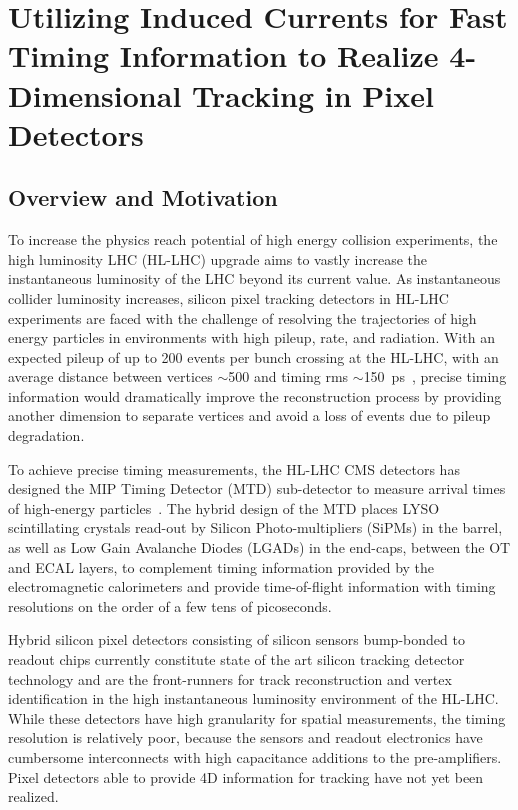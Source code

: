 
\chapter{Utilizing Induced Currents for Fast Timing Information to Realize 4-Dimensional Tracking in Pixel Detectors}

\section{Overview and Motivation}
To increase the physics reach potential of high energy collision experiments, the high luminosity LHC (HL-LHC) upgrade aims to vastly increase the instantaneous luminosity of the LHC beyond its current value. 
As instantaneous collider luminosity increases, silicon pixel tracking detectors in HL-LHC experiments are faced with the challenge of resolving the trajectories of high energy particles in environments with high pileup, rate, and radiation.
With an expected pileup of up to 200 events per bunch crossing at the HL-LHC, with an average distance between vertices $\sim$\SI{500}{\micron} and timing rms $\sim$\SI{150}{\ps}~\cite{CARTIGLIA201747}, precise timing information would dramatically improve the reconstruction process by providing another dimension to separate vertices and avoid a loss of events due to pileup degradation.

To achieve precise timing measurements, the HL-LHC CMS detectors has designed the MIP Timing Detector (MTD) sub-detector to measure arrival times of high-energy particles~\cite{CMS:2667167}.
The hybrid design of the MTD places LYSO scintillating crystals read-out by Silicon Photo-multipliers (SiPMs) in the barrel, as well as Low Gain Avalanche Diodes (LGADs) in the end-caps, between the OT and ECAL layers, to complement timing information provided by the electromagnetic calorimeters and provide time-of-flight information with timing resolutions on the order of a few tens of picoseconds.

Hybrid silicon pixel detectors consisting of silicon sensors bump-bonded to readout chips currently constitute state of the art silicon tracking detector technology and are the front-runners for track reconstruction and vertex identification in the high instantaneous luminosity environment of the HL-LHC.
While these detectors have high granularity for spatial measurements, the timing resolution is relatively poor, because the sensors and readout electronics have cumbersome interconnects with high capacitance additions to the pre-amplifiers. 
Pixel detectors able to provide 4D information for tracking have not yet been realized.



